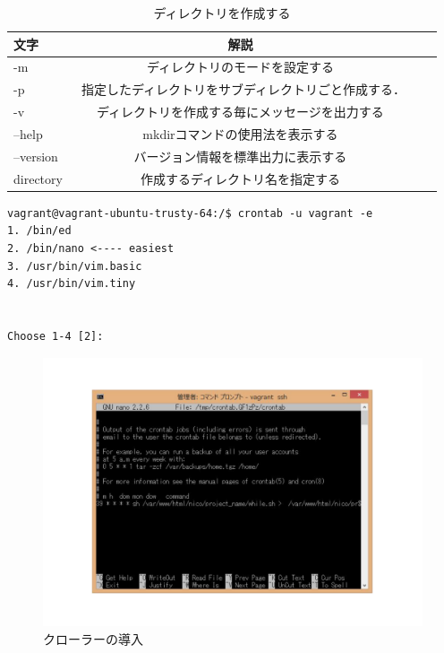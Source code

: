\begin{table}[htb]
	\begin{center}
		 \caption{ディレクトリを作成する}
 			\begin{tabular}{|l|c|r||r|} \hline
      文字 & 解説  \\ \hline \hline
   -m & ディレクトリのモードを設定する　\\ \hline
    -p & 指定したディレクトリをサブディレクトリごと作成する．　\\ \hline
   -v & ディレクトリを作成する毎にメッセージを出力する　\\ \hline
   --help & mkdirコマンドの使用法を表示する \\ \hline
--version	& バージョン情報を標準出力に表示する \\ \hline
directory & 作成するディレクトリ名を指定する \\ \hline
			\end{tabular}
	 \end{center}
\end{table}



	\begin{verbatim}
vagrant@vagrant-ubuntu-trusty-64:/$ crontab -u vagrant -e
1. /bin/ed
2. /bin/nano <---- easiest
3. /usr/bin/vim.basic
4. /usr/bin/vim.tiny


Choose 1-4 [2]:
	\end{verbatim}

\begin{figure}[htb]
\centering
\includegraphics[width=14cm]{crontab10.pdf}
\caption{クローラーの導入}\label{ace}
\end{figure}

